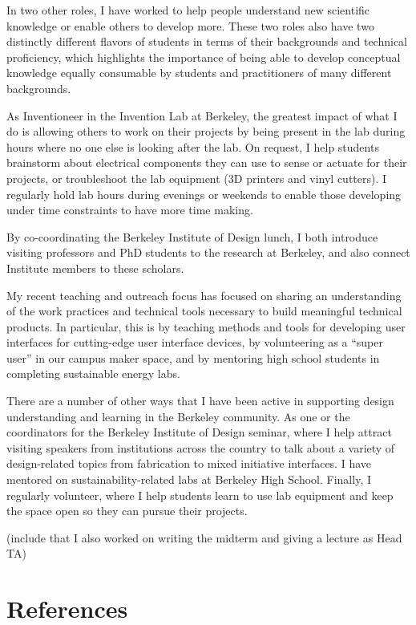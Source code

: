 \documentclass[12pt]{memoir}
\begin{document}
In two other roles, I have worked to help people understand new scientific knowledge or enable others to develop more.
These two roles also have two distinctly different flavors of students in terms of their backgrounds and technical proficiency, which highlights the importance of being able to develop conceptual knowledge equally consumable by students and practitioners of many different backgrounds.

As Inventioneer in the Invention Lab at Berkeley, the greatest impact of what I do is allowing others to work on their projects by being present in the lab during hours where no one else is looking after the lab.
On request, I help students brainstorm about electrical components they can use to sense or actuate for their projects, or troubleshoot the lab equipment (3D printers and vinyl cutters).
I regularly hold lab hours during evenings or weekends to enable those developing under time constraints to have more time making.

By co-coordinating the Berkeley Institute of Design lunch, I both introduce visiting professors and PhD students to the research at Berkeley, and also connect Institute members to these scholars.

My recent teaching and outreach focus has focused on sharing an understanding of the work practices and technical tools necessary to build meaningful technical products.
In particular, this is by teaching methods and tools for developing user interfaces for cutting-edge user interface devices, by volunteering as a ``super user'' in our campus maker space, and by mentoring high school students in completing sustainable energy labs.

There are a number of other ways that I have been active in supporting design understanding and learning in the Berkeley community.
As one or the coordinators for the Berkeley Institute of Design seminar, where I help attract visiting speakers from institutions across the country to talk about a variety of design-related topics from fabrication to mixed initiative interfaces.
I have mentored on sustainability-related labs at Berkeley High School.
Finally, I regularly volunteer, where I help students learn to use lab equipment and keep the space open so they can pursue their projects.

(include that I also worked on writing the midterm and giving a lecture as Head TA)

\section{References}
\printbibliography[heading=none]
\end{document}
